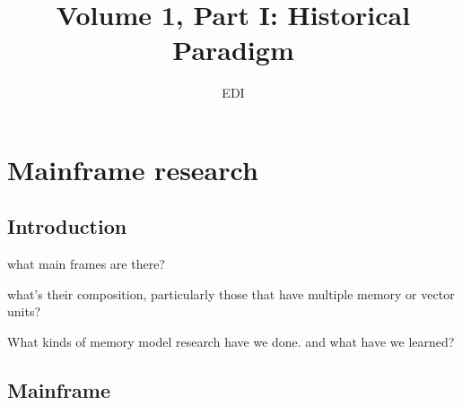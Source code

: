 \documentclass[a4paper,twoside]{scrbook}
\begin{document}
\title{Volume 1, Part I: Historical Paradigm}
\author{EDI}
\frontmatter
\maketitle
\tableofcontents
\mainmatter


\chapter{Mainframe research}
\section{Introduction}

what main frames are there?

what's their composition, particularly those that have multiple memory or vector units?


What kinds of memory model research have we done. and what have we learned?


\section{Mainframe}
\end{document}
